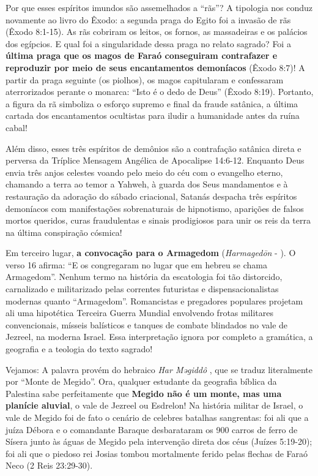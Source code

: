 \documentclass[11pt,a4paper,openany]{book}
\begin{document}
Por que esses espíritos imundos são assemelhados a ``rãs''?
A tipologia nos conduz novamente ao livro do Êxodo: a segunda praga do Egito foi a invasão de rãs (Êxodo 8:1-15). As rãs cobriram os leitos, os fornos, as massadeiras e os palácios dos egípcios. E qual foi a singularidade dessa praga no relato sagrado? Foi a \textbf{última praga que os magos de Faraó conseguiram contrafazer e reproduzir por meio de seus encantamentos demoníacos} (Êxodo 8:7)! A partir da praga seguinte (os piolhos), os magos capitularam e confessaram aterrorizados perante o monarca: ``Isto é o dedo de Deus'' (Êxodo 8:19). Portanto, a figura da rã simboliza o esforço supremo e final da fraude satânica, a última cartada dos encantamentos ocultistas para iludir a humanidade antes da ruína cabal!

Além disso, esses três espíritos de demônios são a contrafação satânica direta e perversa da Tríplice Mensagem Angélica de Apocalipse 14:6-12. Enquanto Deus envia três anjos celestes voando pelo meio do céu com o evangelho eterno, chamando a terra ao temor a Yahweh, à guarda dos Seus mandamentos e à restauração da adoração do sábado criacional, Satanás despacha três espíritos demoníacos com manifestações sobrenaturais de hipnotismo, aparições de falsos mortos queridos, curas fraudulentas e sinais prodigiosos para unir os reis da terra na última conspiração cósmica!

Em terceiro lugar, \textbf{a convocação para o Armagedom} (\textit{Harmagedōn} - ).
O verso 16 afirma: ``E os congregaram no lugar que em hebreu se chama Armagedom''.
Nenhum termo na história da escatologia foi tão distorcido, carnalizado e militarizado pelas correntes futuristas e dispensacionalistas modernas quanto ``Armagedom''. Romancistas e pregadores populares projetam ali uma hipotética Terceira Guerra Mundial envolvendo frotas militares convencionais, mísseis balísticos e tanques de combate blindados no vale de Jezreel, na moderna Israel. Essa interpretação ignora por completo a gramática, a geografia e a teologia do texto sagrado!

Vejamos: A palavra provém do hebraico \textit{Har Məgiddô} , que se traduz literalmente por ``Monte de Megido''.
Ora, qualquer estudante da geografia bíblica da Palestina sabe perfeitamente que \textbf{Megido não é um monte, mas uma planície aluvial}, o vale de Jezreel ou Esdrelon! Na história militar de Israel, o vale de Megido foi de fato o cenário de celebres batalhas sangrentas: foi ali que a juíza Débora e o comandante Baraque desbarataram os 900 carros de ferro de Sísera junto às águas de Megido pela intervenção direta dos céus (Juízes 5:19-20); foi ali que o piedoso rei Josias tombou mortalmente ferido pelas flechas de Faraó Neco (2 Reis 23:29-30).
\end{document}
